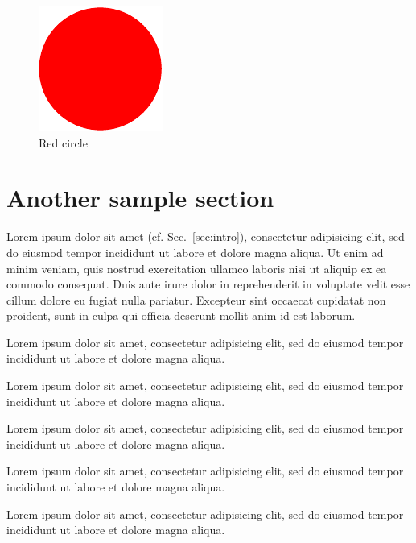 \documentclass{article}
\begin{document}
\begin{figure}
\centering
\includegraphics[width=.5\linewidth]{redcircle}

\caption{Red circle}\label{fig:redcircle}
	
\end{figure}

\section{Another sample section}

Lorem ipsum dolor sit amet (cf. Sec.~\ref{sec:intro}), consectetur adipisicing elit, sed do eiusmod tempor incididunt ut labore et dolore magna aliqua. Ut enim ad minim veniam, quis nostrud exercitation ullamco laboris nisi ut aliquip ex ea commodo consequat. Duis aute irure dolor in reprehenderit in voluptate velit esse cillum dolore eu fugiat nulla pariatur. Excepteur sint occaecat cupidatat non proident, sunt in culpa qui officia deserunt mollit anim id est laborum.

\begin{theorem}
Lorem ipsum dolor sit amet, consectetur adipisicing elit, sed do eiusmod tempor incididunt ut labore et dolore magna aliqua. 
\end{theorem}
\begin{definition}
Lorem ipsum dolor sit amet, consectetur adipisicing elit, sed do eiusmod tempor incididunt ut labore et dolore magna aliqua. 
\end{definition}
\begin{remark}
Lorem ipsum dolor sit amet, consectetur adipisicing elit, sed do eiusmod tempor incididunt ut labore et dolore magna aliqua. 
\end{remark}
\begin{conjecture}
Lorem ipsum dolor sit amet, consectetur adipisicing elit, sed do eiusmod tempor incididunt ut labore et dolore magna aliqua. 
\end{conjecture}
\begin{lemma}
Lorem ipsum dolor sit amet, consectetur adipisicing elit, sed do eiusmod tempor incididunt ut labore et dolore magna aliqua. 
\end{lemma}
\end{document}
